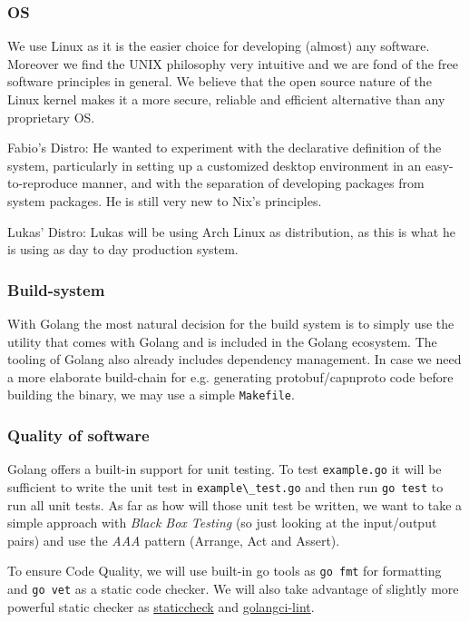 \documentclass[a4paper,english,10pt,NET]{tumarticle}
\renewcommand{\eg}{e.g.\xspace} %
\begin{document}
\subsubsection{OS}
We use Linux as it is the easier choice for developing (almost) any software. Moreover we find the UNIX philosophy very intuitive and we are fond of the free software principles in general. We believe that the open source nature of the Linux kernel makes it a more secure, reliable and efficient alternative than any proprietary OS.

Fabio's Distro:
He wanted to experiment with the declarative definition of the system, particularly in setting up a customized desktop environment in an easy-to-reproduce manner, and with the separation of developing packages from system packages. He is still very new to Nix's principles.

Lukas' Distro:
Lukas will be using Arch Linux as distribution, as this is what he is using as day to day production system.


\subsubsection{Build-system}
With Golang the most natural decision for the build system is to simply use the utility that comes with Golang and is included in the Golang ecosystem.
The tooling of Golang also already includes dependency management.
In case we need a more elaborate build-chain for \eg generating protobuf/capnproto code before building the binary, we may use a simple \texttt{Makefile}.

\subsubsection{Quality of software}

Golang offers a built-in support for unit testing. To test \verb|example.go| it will be sufficient to write the unit test in \verb|example\_test.go| and then run \verb|go test| to run all unit tests. As far as how will those unit test be written, we want to take a simple approach with \textit{Black Box Testing} (so just looking at the input/output pairs) and use the \textit{AAA} pattern (Arrange, Act and Assert).

To ensure Code Quality, we will use built-in go tools as \verb|go fmt| for formatting and \verb|go vet| as a static code checker. We will also take advantage of slightly more powerful static checker as \href{https://staticcheck.dev/}{staticcheck} and \href{https://github.com/golangci/golangci-lint}{golangci-lint}.
\end{document}
